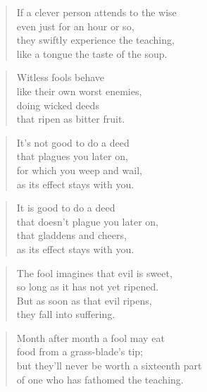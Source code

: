 \documentclass[12pt,openany]{book}%
\begin{document}
\begin{verse}%
If a clever person attends to the wise \\
even just for an hour or so, \\
they swiftly experience the teaching, \\
like a tongue the taste of the soup. 

%
\end{verse}

\begin{verse}%
Witless fools behave \\
like their own worst enemies, \\
doing wicked deeds \\
that ripen as bitter fruit. 

%
\end{verse}

\begin{verse}%
It’s not good to do a deed \\
that plagues you later on, \\
for which you weep and wail, \\
as its effect stays with you. 

%
\end{verse}

\begin{verse}%
It is good to do a deed \\
that doesn’t plague you later on, \\
that gladdens and cheers, \\
as its effect stays with you. 

%
\end{verse}

\begin{verse}%
The fool imagines that evil is sweet, \\
so long as it has not yet ripened. \\
But as soon as that evil ripens, \\
they fall into suffering. 

%
\end{verse}

\begin{verse}%
Month after month a fool may eat \\
food from a grass-blade’s tip; \\
but they’ll never be worth a sixteenth part \\
of one who has fathomed the teaching. 

%
\end{verse}
\end{document}
